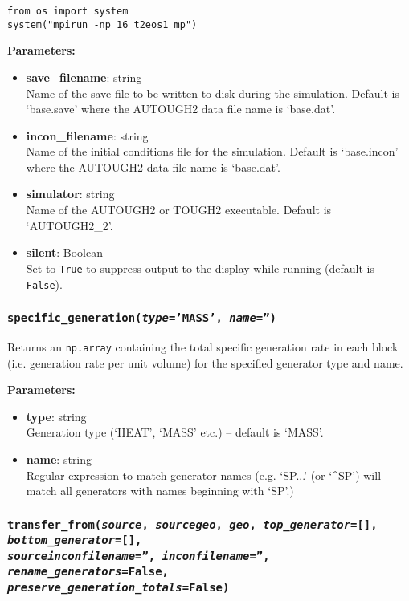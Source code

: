 \begin{lstlisting}
from os import system
system("mpirun -np 16 t2eos1_mp")
\end{lstlisting}

\textbf{Parameters:}
\begin{itemize}
\item \textbf{save\_filename}: string\\
  Name of the save file to be written to disk during the simulation.  Default is `base.save' where the AUTOUGH2 data file name is `base.dat'.
\item \textbf{incon\_filename}: string\\
  Name of the initial conditions file for the simulation.  Default is `base.incon' where the AUTOUGH2 data file name is `base.dat'.
\item \textbf{simulator}: string\\
  Name of the AUTOUGH2 or TOUGH2 executable.  Default is `AUTOUGH2\_2'.
\item \textbf{silent}: Boolean\\
  Set to \texttt{True} to suppress output to the display while running (default is \texttt{False}).
\end{itemize}

\begin{snugshade}
\subsubsection{\texttt{specific\_generation(\emph{type}='MASS', \emph{name}='')}}
\end{snugshade}
\label{sec:t2data:specific_generation}

Returns an \texttt{np.array} containing the total specific generation rate in each block (i.e. generation rate per unit volume) for the specified generator type and name.

\textbf{Parameters:}
\begin{itemize}
\item \textbf{type}: string\\
  Generation type (`HEAT', `MASS' etc.) -- default is `MASS'.
\item \textbf{name}: string\\
  Regular expression to match generator names (e.g. `SP...' (or `\^{}SP') will match all generators with names beginning with `SP'.)
\end{itemize}

\begin{snugshade}
\subsubsection{\texttt{transfer\_from(\emph{source}, \emph{sourcegeo}, \emph{geo}, \emph{top\_generator}=[], \emph{bottom\_generator}=[],\\
    \emph{sourceinconfilename}='', \emph{inconfilename}='', \emph{rename\_generators}=False, \\
    \emph{preserve\_generation\_totals}=False)}}
\end{snugshade}
\label{sec:t2data:transfer_from}


